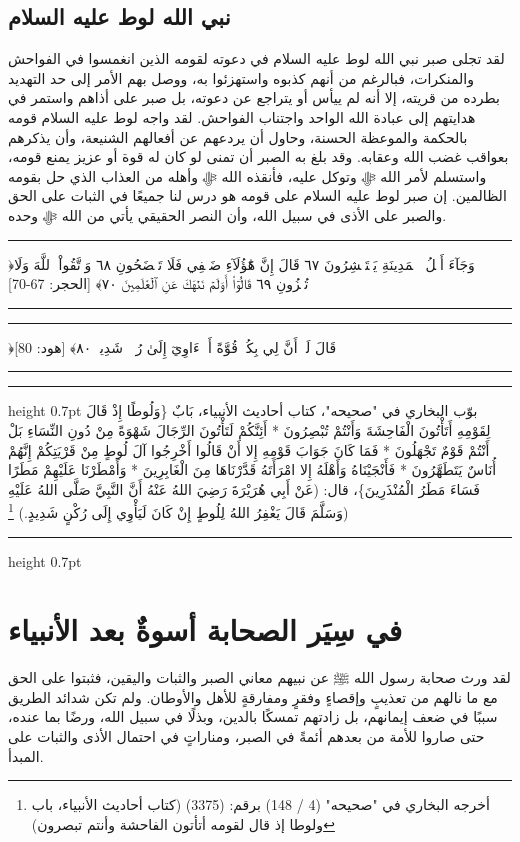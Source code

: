 \documentclass[12pt,openany]{book}
\newenvironment{quranblock}
  {\par\medskip\begin{center}\begin{minipage}{0.92\linewidth}\centering\quranfont\large\color{ink}\hrule\vspace{0.65em}}
  {\vspace{0.65em}\hrule\end{minipage}\end{center}\medskip}
\newenvironment{hadithblock}
  {\par\medskip\noindent\begin{minipage}{\linewidth}\hrule height 0.7pt \vspace{0.6em}\small}
  {\vspace{0.4em}\hrule height 0.7pt\end{minipage}\par\medskip}
\begin{document}
\section{نبي الله لوط عليه السلام}
لقد تجلى صبر نبي الله لوط عليه السلام في دعوته لقومه الذين انغمسوا في الفواحش والمنكرات، فبالرغم من أنهم كذبوه واستهزئوا به، ووصل بهم الأمر إلى حد التهديد بطرده من قريته، إلا أنه لم ييأس أو يتراجع عن دعوته، بل صبر على أذاهم واستمر في هدايتهم إلى عبادة الله الواحد واجتناب الفواحش. لقد واجه لوط عليه السلام قومه بالحكمة والموعظة الحسنة، وحاول أن يردعهم عن أفعالهم الشنيعة، وأن يذكرهم بعواقب غضب الله وعقابه. وقد بلغ به الصبر أن تمنى لو كان له قوة أو عزيز يمنع قومه، واستسلم لأمر الله ﷻ وتوكل عليه، فأنقذه الله ﷻ وأهله من العذاب الذي حل بقومه الظالمين. إن صبر لوط عليه السلام على قومه هو درس لنا جميعًا في الثبات على الحق والصبر على الأذى في سبيل الله، وأن النصر الحقيقي يأتي من الله ﷻ وحده.

\begin{quranblock}
﴿وَجَآءَ أَهۡلُ ٱلۡمَدِينَةِ يَسۡتَبۡشِرُونَ ٦٧ قَالَ إِنَّ هَٰٓؤُلَآءِ ضَيۡفِي فَلَا تَفۡضَحُونِ ٦٨ وَٱتَّقُواْ ٱللَّهَ وَلَا تُخۡزُونِ ٦٩ قَالُوٓاْ أَوَلَمۡ نَنۡهَكَ عَنِ ٱلۡعَٰلَمِينَ ٧٠﴾ [الحجر: 67-70]
\end{quranblock}

\begin{quranblock}
﴿قَالَ ‌لَوۡ ‌أَنَّ ‌لِي ‌بِكُمۡ ‌قُوَّةً أَوۡ ءَاوِيٓ إِلَىٰ رُكۡنٖ شَدِيدٖ ٨٠﴾ [هود: 80]
\end{quranblock}

\begin{hadithblock}
بوّب البخاري في "صحيحه"، كتاب أحاديث الأنبياء، ‌‌بَابٌ \{‌وَلُوطًا إِذْ قَالَ لِقَوْمِهِ أَتَأْتُونَ الْفَاحِشَةَ وَأَنْتُمْ تُبْصِرُونَ * أَئِنَّكُمْ لَتَأْتُونَ الرِّجَالَ شَهْوَةً مِنْ دُونِ النِّسَاءِ بَلْ أَنْتُمْ قَوْمٌ تَجْهَلُونَ * فَمَا كَانَ جَوَابَ قَوْمِهِ إِلا أَنْ قَالُوا أَخْرِجُوا آلَ لُوطٍ مِنْ قَرْيَتِكُمْ إِنَّهُمْ أُنَاسٌ يَتَطَهَّرُونَ * فَأَنْجَيْنَاهُ وَأَهْلَهُ إِلا امْرَأَتَهُ قَدَّرْنَاهَا مِنَ الْغَابِرِينَ * وَأَمْطَرْنَا عَلَيْهِمْ مَطَرًا فَسَاءَ مَطَرُ الْمُنْذَرِينَ\}، قال: (عَنْ أَبِي هُرَيْرَةَ رَضِيَ اللهُ عَنْهُ أَنَّ النَّبِيَّ صَلَّى اللهُ عَلَيْهِ وَسَلَّمَ قَالَ يَغْفِرُ اللهُ لِلُوطٍ إِنْ كَانَ لَيَأْوِي إِلَى رُكْنٍ شَدِيدٍ.) \footnote{أخرجه البخاري في "صحيحه" (4 / 148) برقم: (3375) (كتاب أحاديث الأنبياء، باب ولوطا إذ قال لقومه أتأتون الفاحشة وأنتم تبصرون)})
\end{hadithblock}

\chapter{في سِيَر الصحابة أسوةٌ بعد الأنبياء}
لقد ورث صحابة رسول الله ﷺ عن نبيهم معاني الصبر والثبات واليقين، فثبتوا على الحق مع ما نالهم من تعذيبٍ وإقصاءٍ وفقرٍ ومفارقةٍ للأهل والأوطان. ولم تكن شدائد الطريق سببًا في ضعف إيمانهم، بل زادتهم تمسكًا بالدين، وبذلًا في سبيل الله، ورضًا بما عنده، حتى صاروا للأمة من بعدهم أئمةً في الصبر، ومناراتٍ في احتمال الأذى والثبات على المبدأ.
\end{document}

